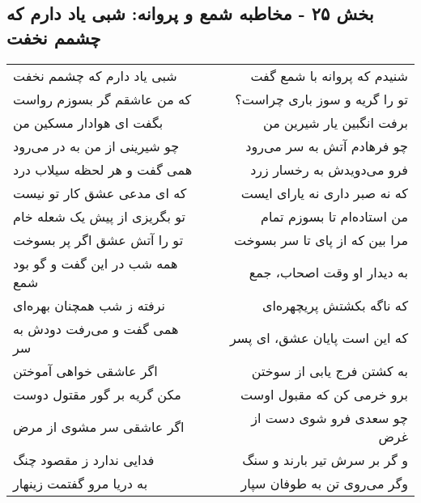 \begin{center}
\section*{بخش ۲۵ - مخاطبه شمع و پروانه: شبی یاد دارم که چشمم نخفت}
\label{sec:025}
\begin{longtable}{l p{0.5cm} r}
شبی یاد دارم که چشمم نخفت
&&
شنیدم که پروانه با شمع گفت
\\
که من عاشقم گر بسوزم رواست
&&
تو را گریه و سوز باری چراست؟
\\
بگفت ای هوادار مسکین من
&&
برفت انگبین یار شیرین من
\\
چو شیرینی از من به در می‌رود
&&
چو فرهادم آتش به سر می‌رود
\\
همی گفت و هر لحظه سیلاب درد
&&
فرو می‌دویدش به رخسار زرد
\\
که ای مدعی عشق کار تو نیست
&&
که نه صبر داری نه یارای ایست
\\
تو بگریزی از پیش یک شعله خام
&&
من استاده‌ام تا بسوزم تمام
\\
تو را آتش عشق اگر پر بسوخت
&&
مرا بین که از پای تا سر بسوخت
\\
همه شب در این گفت و گو بود شمع
&&
به دیدار او وقت اصحاب، جمع
\\
نرفته ز شب همچنان بهره‌ای
&&
که ناگه بکشتش پریچهره‌ای
\\
همی گفت و می‌رفت دودش به سر
&&
که این است پایان عشق، ای پسر
\\
اگر عاشقی خواهی آموختن
&&
به کشتن فرج یابی از سوختن
\\
مکن گریه بر گور مقتول دوست
&&
برو خرمی کن که مقبول اوست
\\
اگر عاشقی سر مشوی از مرض
&&
چو سعدی فرو شوی دست از غرض
\\
فدایی ندارد ز مقصود چنگ
&&
و گر بر سرش تیر بارند و سنگ
\\
به دریا مرو گفتمت زینهار
&&
وگر می‌روی تن به طوفان سپار
\\
\end{longtable}
\end{center}
